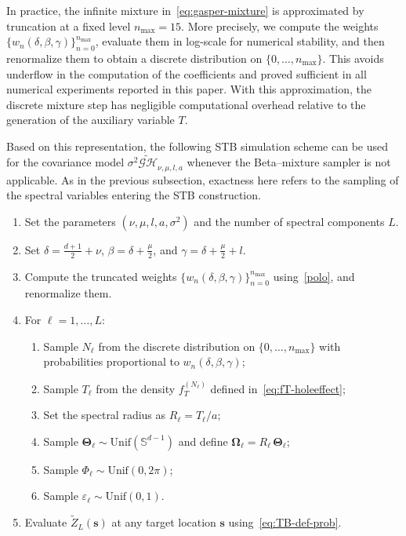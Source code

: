 \documentclass[
  12pt]{article}
\begin{document}
In practice, the infinite mixture in~\eqref{eq:gasper-mixture} is approximated by truncation at a fixed level $n_{\max}=15$.
More precisely, we compute the weights $\{w_n(\delta,\beta,\gamma)\}_{n=0}^{n_{\max}}$, evaluate them in log-scale for numerical stability, and then renormalize them to obtain a discrete distribution on $\{0,\dots,n_{\max}\}$.
This avoids underflow in the computation of the coefficients and proved sufficient in all numerical experiments reported in this paper.
With this approximation, the discrete mixture step has negligible computational overhead relative to the generation of the auxiliary variable $T$.

Based on this representation, the following STB simulation scheme can be used for the covariance model $\sigma^2 \widetilde{\mathcal{GH}}_{\nu,\mu,l,a}$ whenever the Beta--mixture sampler is not applicable.
As in the previous subsection, exactness here refers to the sampling of the spectral variables entering the STB construction.

\begin{enumerate}
\item Set the parameters $(\nu,\mu,l,a,\sigma^2)$ and the number of spectral components $L$.
\item Set $\delta = \tfrac{d+1}{2} + \nu$, $\beta = \delta + \tfrac{\mu}{2}$, and $\gamma = \delta + \tfrac{\mu}{2} + l$.
\item Compute the truncated weights $\{w_n(\delta,\beta,\gamma)\}_{n=0}^{n_{\max}}$ using~\eqref{polo}, and renormalize them.
\item For $\ell=1,\ldots,L$:
\begin{enumerate}
\item Sample $N_\ell$ from the discrete distribution on $\{0,\dots,n_{\max}\}$ with probabilities proportional to $w_n(\delta,\beta,\gamma)$;
\item Sample $T_\ell$ from the density $f_T^{(N_\ell)}$ defined in~\eqref{eq:fT-holeeffect};
\item Set the spectral radius as $R_\ell=T_\ell/a$;
\item Sample $\boldsymbol{\Theta}_\ell\sim\mathrm{Unif}(\mathbb{S}^{d-1})$ and define $\boldsymbol{\Omega}_\ell = R_\ell\,\boldsymbol{\Theta}_\ell$;
\item Sample $\Phi_\ell\sim\mathrm{Unif}(0,2\pi)$;
\item Sample $\varepsilon_\ell\sim\mathrm{Unif}(0,1)$.
\end{enumerate}
\item Evaluate $\widetilde Z_L(\mathbf{s})$ at any target location $\mathbf{s}$ using~\eqref{eq:TB-def-prob}.
\end{enumerate}
\end{document}
